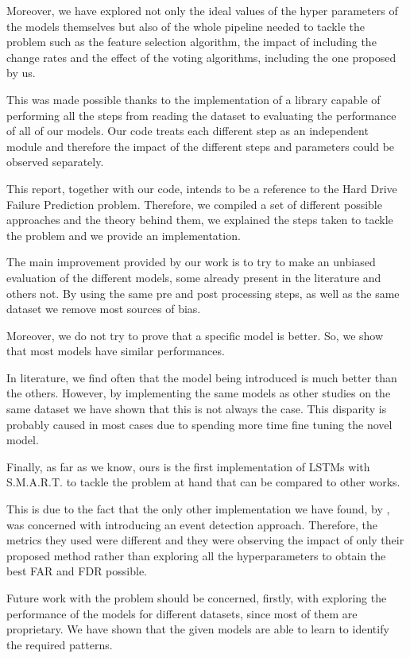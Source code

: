 Moreover, we have explored not only the ideal values of the hyper parameters of the models themselves but also of the whole pipeline needed to tackle the problem such as the feature selection algorithm, the impact of including the change rates and the effect of the voting algorithms, including the one proposed by us.

This was made possible thanks to the implementation of a library capable of performing all the steps from reading the dataset to evaluating the performance of all of our models.
Our code treats each different step as an independent module and therefore the impact of the different steps and parameters could be observed separately.

This report, together with our code, intends to be a reference to the Hard Drive Failure Prediction problem.
Therefore, we compiled a set of different possible approaches and the theory behind them, we explained the steps taken to tackle the problem and we provide an implementation.

The main improvement provided by our work is to try to make an unbiased evaluation of the different models, some already present in the literature and others not.
By using the same pre and post processing steps, as well as the same dataset we remove most sources of bias.

Moreover, we do not try to prove that a specific model is better.
So, we show that most models have similar performances.

In literature, we find often that the model being introduced is much better than the others. 
However, by implementing the same models as other studies on the same dataset we have shown that this is not always the case.
This disparity is probably caused in most cases due to spending more time fine tuning the novel model.

Finally, as far as we know, ours is the first implementation of LSTMs with S.M.A.R.T. to tackle the problem at hand that can be compared to other works.

This is due to the fact that the only other implementation we have found, by \cite{zhang2017deep}, was concerned with introducing an event detection approach.
Therefore, the metrics they used were different and they were observing the impact of only their proposed method rather than exploring all the hyperparameters to obtain the best FAR and FDR possible.

Future work with the problem should be concerned, firstly, with exploring the performance of the models for different datasets, since most of them are proprietary.
We have shown that the given models are able to learn to identify the required patterns.

